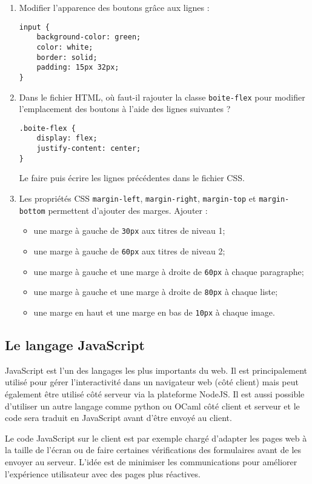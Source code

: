 \documentclass[a4paper]{article}
\begin{document}
\begin{enumerate}
  \item Modifier l'apparence des boutons grâce aux lignes :
    \begin{verbatim}
input {
    background-color: green;
    color: white;
    border: solid;
    padding: 15px 32px;
}
    \end{verbatim}
  \item Dans le fichier HTML, où faut-il rajouter la classe \texttt{boite-flex} pour modifier l'emplacement des boutons à l'aide des lignes suivantes ?
    \begin{verbatim}
.boite-flex {
    display: flex;
    justify-content: center;
}
    \end{verbatim}
    Le faire puis écrire les lignes précédentes dans le fichier CSS.
  \item Les propriétés CSS \texttt{margin-left}, \texttt{margin-right}, \texttt{margin-top} et \texttt{margin-bottom} permettent d'ajouter des marges. Ajouter :
    \begin{itemize}
      \item une marge à gauche de \texttt{30px} aux titres de niveau 1;
      \item une marge à gauche de \texttt{60px} aux titres de niveau 2;
      \item une marge à gauche et une marge à droite de \texttt{60px} à chaque paragraphe;
      \item une marge à gauche et une marge à droite de \texttt{80px} à chaque liste;
      \item une marge en haut et une marge en bas de \texttt{10px} à chaque image.
    \end{itemize}
\end{enumerate}

\pagebreak

\subsection{Le langage JavaScript}
JavaScript est l'un des langages les plus importants du web. Il est
principalement utilisé pour gérer l'interactivité dans un navigateur web (côté
client) mais peut également être utilisé côté serveur via la plateforme NodeJS.
Il est aussi possible d'utiliser un autre langage comme python ou OCaml côté
client et serveur et le code sera traduit en JavaScript avant d'être envoyé au
client.

Le code JavaScript sur le client est par exemple chargé d'adapter les pages web
à la taille de l'écran ou de faire certaines vérifications des formulaires avant
de les envoyer au serveur. L'idée est de minimiser les communications pour
améliorer l'expérience utilisateur avec des pages plus réactives.
\end{document}
